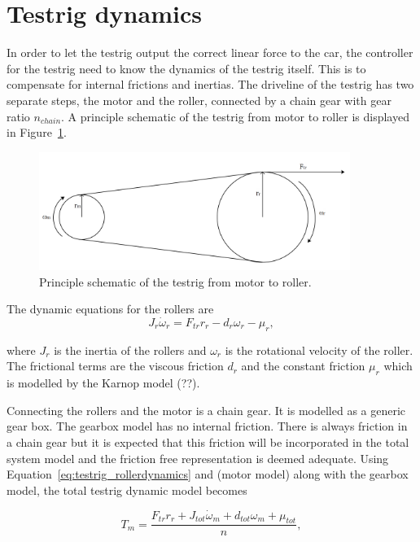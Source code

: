 \section{Testrig dynamics}\label{sec:rigdynamics}
In order to let the testrig output the correct linear force to the car, the
controller for the testrig need to know the dynamics of the testrig itself. This
is to compensate for internal frictions and inertias. The driveline of the
testrig has two separate steps, the motor and the roller, connected by a chain
gear with gear ratio $n_{chain}$. A principle schematic of the testrig from
motor to roller is displayed in Figure~\ref{fig:testrig_testrigdynamics}.
\begin{figure}[H]
    \centering
    \includegraphics[width=0.9\textwidth]{./img/testrig_rollerschematic.png}
    \caption{Principle schematic of the testrig from motor to
    roller.}\label{fig:testrig_testrigdynamics}
\end{figure}
The dynamic equations for the rollers are
\begin{equation} \label{eq:testrig_rollerdynamics}
    J_r \dot{\omega}_r = F_{tr}r_r - d_r \omega_r - \mu_r,
\end{equation}

where $J_r$ is the inertia of the rollers and $\omega_r$ is the rotational velocity
of the roller. The frictional terms are the viscous friction $d_r$ and the
constant friction $\mu_r$ which is modelled by the Karnop model (??).

Connecting the rollers and the motor is a chain gear. It is modelled as a
generic gear box. The gearbox model has no internal friction. There is always
friction in a chain gear but it is expected that this friction will be
incorporated in the total system model and the friction free representation is
deemed adequate.  Using Equation~\ref{eq:testrig_rollerdynamics} and (motor
model) along with the gearbox model, the total testrig dynamic model becomes

\begin{equation} \label{eq:testrig_totaldynamics} 
    T_m = \frac{F_{tr} r_r + J_{tot} \dot{\omega}_m + d_{tot} \omega_m + \mu_{tot}}{n},
\end{equation}

